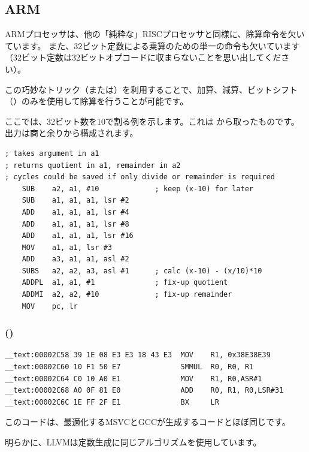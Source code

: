 ﻿\subsection{ARM}

ARMプロセッサは、他の「純粋な」RISCプロセッサと同様に、除算命令を欠いています。
また、32ビット定数による乗算のための単一の命令も欠いています（32ビット定数は32ビットオプコードに収まらないことを思い出してください）。

この巧妙なトリック（または）を利用することで、加算、減算、ビットシフト（）のみを使用して除算を行うことが可能です。

ここでは、32ビット数を10で割る例を示します。これは
から取ったものです。
出力は商と余りから構成されます。

\begin{lstlisting}[style=customasmARM]
; takes argument in a1
; returns quotient in a1, remainder in a2
; cycles could be saved if only divide or remainder is required
    SUB    a2, a1, #10             ; keep (x-10) for later
    SUB    a1, a1, a1, lsr #2
    ADD    a1, a1, a1, lsr #4
    ADD    a1, a1, a1, lsr #8
    ADD    a1, a1, a1, lsr #16
    MOV    a1, a1, lsr #3
    ADD    a3, a1, a1, asl #2
    SUBS   a2, a2, a3, asl #1      ; calc (x-10) - (x/10)*10
    ADDPL  a1, a1, #1              ; fix-up quotient
    ADDMI  a2, a2, #10             ; fix-up remainder
    MOV    pc, lr
\end{lstlisting}

\subsubsection{\OptimizingXcodeIV (\ARMMode)}

\begin{lstlisting}[style=customasmARM]
__text:00002C58 39 1E 08 E3 E3 18 43 E3  MOV    R1, 0x38E38E39
__text:00002C60 10 F1 50 E7              SMMUL  R0, R0, R1
__text:00002C64 C0 10 A0 E1              MOV    R1, R0,ASR#1
__text:00002C68 A0 0F 81 E0              ADD    R0, R1, R0,LSR#31
__text:00002C6C 1E FF 2F E1              BX     LR
\end{lstlisting}

このコードは、最適化するMSVCとGCCが生成するコードとほぼ同じです。

明らかに、LLVMは定数生成に同じアルゴリズムを使用しています。


